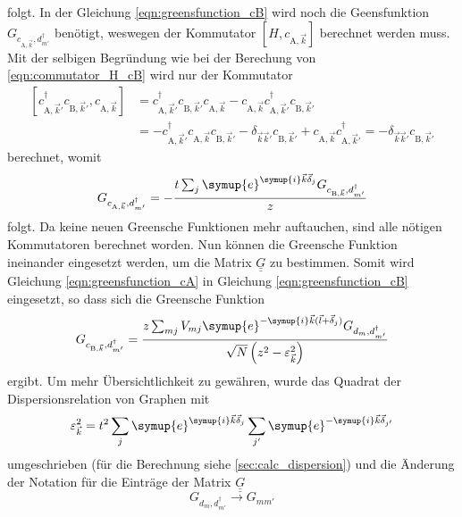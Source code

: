 folgt.
In der Gleichung \eqref{eqn:greensfunction_cB} wird noch die Geensfunktion $G_{c_{\text{A},\vec{k}},d^\dagger_{m'}}$ benötigt, weswegen der Kommutator
$\left [H, c_{\text{A},\vec{k}} \right ]$ berechnet werden muss.
Mit der selbigen Begründung wie bei der Berechung von \eqref{eqn:commutator_H_cB} wird nur der Kommutator
\begin{align*}
    \left [ c^\dagger_{\text{A},\vec{k}'} c_{\text{B},\vec{k}'}, c_{\text{A},\vec{k}} \right ]  &= c^\dagger_{\text{A},\vec{k}'}  c_{\text{B},\vec{k}'} c_{\text{A},\vec{k}}
    - c_{\text{A},\vec{k}} c^\dagger_{\text{A},\vec{k}'} c_{\text{B},\vec{k}'} \\
    &= - c^\dagger_{\text{A},\vec{k}'}  c_{\text{A},\vec{k}} c_{\text{B},\vec{k}'} - \delta_{\vec{k}\vec{k}'} c_{\text{B},\vec{k}'} 
    + c_{\text{A},\vec{k}} c^\dagger_{\text{A},\vec{k}'} = - \delta_{\vec{k}\vec{k}'} c_{\text{B},\vec{k}'} 
\end{align*}
berechnet, womit 
\begin{equation}
    G_{c_{\text{A},\vec{k}},d^\dagger_{m'}} = - \frac{t \sum_{j}\symup{e}^{\symup{i}\vec{k}\vec{\delta}_j} G_{c_{\text{B},\vec{k}}, d^\dagger_{m'}}} {z} \label{eqn:greensfunction_cA}
\end{equation}
folgt.
Da keine neuen Greensche Funktionen mehr auftauchen, sind alle nötigen Kommutatoren berechnet worden. 
Nun können die Greensche Funktion ineinander eingesetzt werden, um die Matrix $\underline{\underline{G}}$ zu bestimmen.
Somit wird Gleichung \eqref{eqn:greensfunction_cA} in Gleichung \eqref{eqn:greensfunction_cB} eingesetzt, so dass sich die Greensche Funktion
\begin{equation}
    G_{c_{\text{B},\vec{k}}, d^\dagger_{m'}} = \frac{z\sum_{mj} V_{mj} \symup{e}^{-\symup{i}\vec{k} (\vec{l}+\vec{\delta}_j)} G_{d_m, d_{m'}^\dagger}}
    {\sqrt{N}\left ( z^2-\varepsilon_{\vec{k}}^2 \right )} \label{eqn:finalgreencB}
\end{equation}
ergibt.
Um mehr Übersichtlichkeit zu gewähren, wurde das Quadrat der Dispersionsrelation von Graphen mit
\begin{equation*}
     \varepsilon_{\vec{k}}^2 = t^2 \sum_j \symup{e}^{\symup{i}\vec{k}\vec{\delta}_j} \sum_{j'} \symup{e}^{-\symup{i}\vec{k}\vec{\delta}_{j'}} 
\end{equation*}  
umgeschrieben (für die Berechnung siehe \ref{sec:calc_dispersion})
und die Änderung der Notation für die Einträge der Matrix $\underline{\underline{G}}$
\begin{equation*}
    G_{d_m, d^\dagger_{m'}} \to G_{mm'}
\end{equation*}
